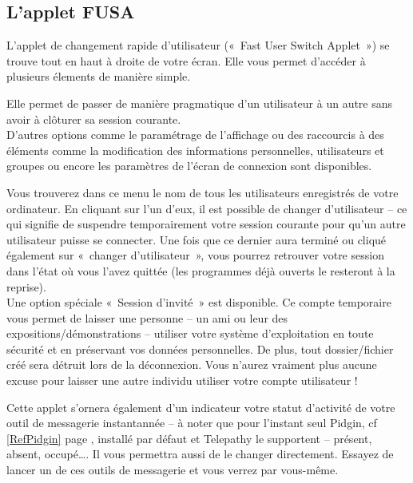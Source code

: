 \subsection{L'applet FUSA}
\label{RefSwitchUser}
L'applet de changement rapide d'utilisateur («~Fast User Switch Applet~») se trouve tout en haut à droite de votre écran. Elle vous permet d'accéder à plusieurs élements de manière simple.\par
Elle permet de passer de manière pragmatique d'un utilisateur à un autre sans avoir à clôturer sa session courante.\\
D'autres options comme le paramétrage de l'affichage ou des raccourcis à des éléments comme la modification des informations personnelles, utilisateurs et groupes ou encore les paramètres de l'écran de connexion sont disponibles.\par
Vous trouverez dans ce menu le nom de tous les utilisateurs enregistrés de votre ordinateur. En cliquant sur l'un d'eux, il est possible de changer d'utilisateur -- ce qui signifie de suspendre temporairement votre session courante pour qu'un autre utilisateur puisse se connecter. Une fois que ce dernier aura terminé ou cliqué également sur «~changer d'utilisateur~», vous pourrez retrouver votre session dans l'état où vous l'avez quittée (les programmes déjà ouverts le resteront à la reprise).\\
Une option spéciale «~Session d'invité~» est disponible. Ce compte temporaire vous permet de laisser une personne -- un ami ou leur des expositions/\IndicCesure{}démonstrations -- utiliser votre système d'exploitation en toute sécurité et en préservant vos données personnelles. De plus, tout dossier/fichier créé sera détruit lors de la déconnexion. Vous n'aurez vraiment plus aucune excuse pour laisser une autre individu utiliser votre compte utilisateur !\par
Cette applet s'ornera également d'un indicateur votre statut d'activité de votre outil de messagerie instantannée -- à noter que pour l'instant seul Pidgin, cf \ref{RefPidgin} page \pageref{RefPidgin}, installé par défaut et Telepathy le supportent -- présent, absent, occupé\ldots{}. Il vous permettra aussi de le changer directement. Essayez de lancer un de ces outils de messagerie et vous verrez par vous-même.\par
